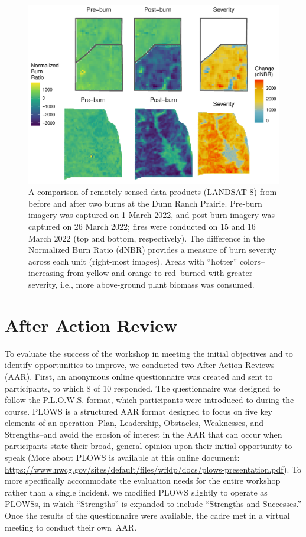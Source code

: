 \documentclass[fire,casereport,accept,moreauthors,pdftex]{Definitions/mdpi}  %
\begin{document}
\begin{figure}[H]
\includegraphics[width=1\columnwidth]{severity_gg-1.pdf}
\caption{A comparison of remotely-sensed data products (LANDSAT 8) from before and after two burns at the Dunn Ranch Prairie. Pre-burn imagery was captured on 1 March 2022, and post-burn imagery was captured on 26 March 2022; fires were conducted on 15 and 16 March 2022 (top and bottom, respectively). The difference in the Normalized Burn Ratio (dNBR) provides a measure of burn severity across each unit (right-most images). Areas with ``hotter'' colors--increasing from yellow and orange to red--burned with greater severity, i.e., more above-ground plant biomass was consumed. \label{severity}}
\end{figure}

\section{After Action Review}

To evaluate the success of the workshop in meeting the initial objectives and to identify opportunities to improve, we conducted two After Action Reviews (AAR).
First, an anonymous online questionnaire was created and sent to participants, to which 8 of 10 responded.
The questionnaire was designed to follow the P.L.O.W.S. format, which participants were introduced to during the course.
PLOWS is a structured AAR format designed to focus on five key elements of an operation--Plan, Leadership, Obstacles, Weaknesses, and Strengths--and avoid the erosion of interest in the AAR that can occur when participants state their broad, general opinion upon their initial opportunity to speak ({More about PLOWS is available at this online} document: \url{https://www.nwcg.gov/sites/default/files/wfldp/docs/plows-presentation.pdf}). %
To more specifically accommodate the evaluation needs for the entire workshop rather than a single incident, we modified PLOWS slightly to operate as PLOWSs, in which ``Strengths'' is expanded to include ``Strengths and Successes.''
Once the results of the questionnaire were available, the cadre met in a virtual meeting to conduct their own~AAR.
\end{document}
